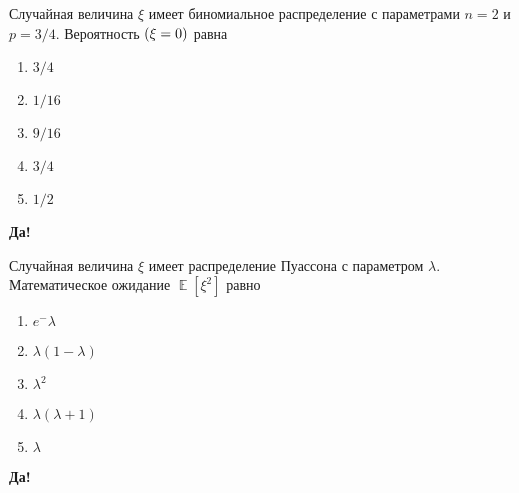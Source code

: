 \documentclass[t]{beamer}
\DeclareMathOperator{\E}{\mathbb{E}}
\let\P\relax
\DeclareMathOperator{\P}{\mathbb{P}}
\begin{document}
 \begin{frame} \label{26-Yes} 
\begin{block}{26} 

Случайная величина $\xi$ имеет биномиальное распределение с параметрами $n = 2$ и $p = 3/4$. Вероятность $\P(\xi = 0)$ равна
  


 \end{block} 
\begin{enumerate} 
\item[] \hyperlink{26-No}{\beamergotobutton{} $3/4$}
\item[] \hyperlink{26-Yes}{\beamergotobutton{} $1/16$}
\item[] \hyperlink{26-No}{\beamergotobutton{} $9/16$}
\item[] \hyperlink{26-No}{\beamergotobutton{} $3/4$}
\item[] \hyperlink{26-No}{\beamergotobutton{} $1/2$}
\end{enumerate} 

 \textbf{Да!} 
 \hyperlink{27}{}\end{frame} 


 \begin{frame} \label{27-Yes} 
\begin{block}{27} 

Случайная величина $\xi$ имеет распределение Пуассона с параметром $\lambda$. Математическое ожидание $\E[\xi^2]$ равно
  


 \end{block} 
\begin{enumerate} 
\item[] \hyperlink{27-No}{\beamergotobutton{} $e^-\lambda$}
\item[] \hyperlink{27-No}{\beamergotobutton{} $\lambda(1 - \lambda)$}
\item[] \hyperlink{27-No}{\beamergotobutton{} $\lambda^2$}
\item[] \hyperlink{27-Yes}{\beamergotobutton{} $\lambda(\lambda+1)$}
\item[] \hyperlink{27-No}{\beamergotobutton{} $\lambda$}
\end{enumerate} 

 \textbf{Да!} 
 \hyperlink{28}{}\end{frame} 
\end{document}
